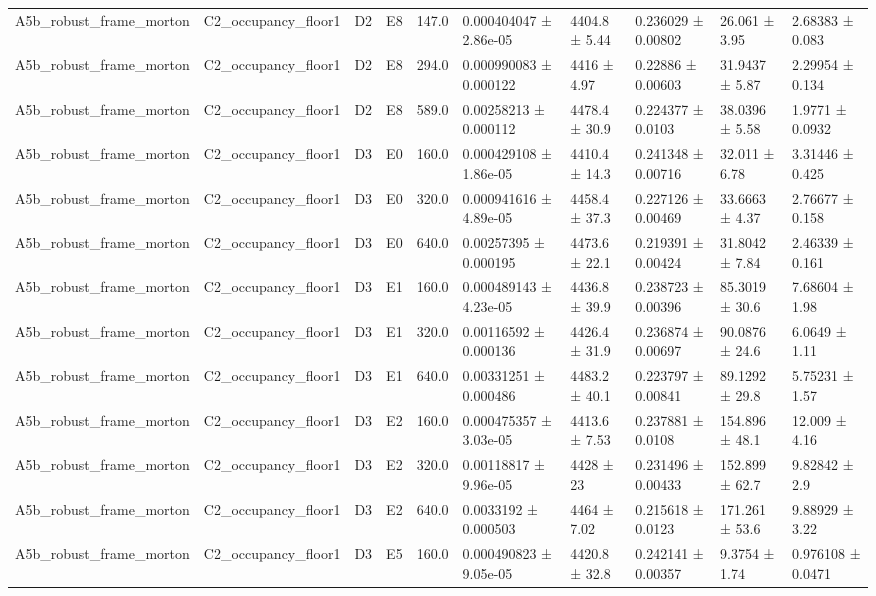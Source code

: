 \begin{table}
\begin{tabular}{llllllllll}
A5b\_robust\_frame\_morton & C2\_occupancy\_floor1 & D2 & E8 & 147.0 & 0.000404047 ± 2.86e-05 & 4404.8 ± 5.44 & 0.236029 ± 0.00802 & 26.061 ± 3.95 & 2.68383 ± 0.083 \\
A5b\_robust\_frame\_morton & C2\_occupancy\_floor1 & D2 & E8 & 294.0 & 0.000990083 ± 0.000122 & 4416 ± 4.97 & 0.22886 ± 0.00603 & 31.9437 ± 5.87 & 2.29954 ± 0.134 \\
A5b\_robust\_frame\_morton & C2\_occupancy\_floor1 & D2 & E8 & 589.0 & 0.00258213 ± 0.000112 & 4478.4 ± 30.9 & 0.224377 ± 0.0103 & 38.0396 ± 5.58 & 1.9771 ± 0.0932 \\
A5b\_robust\_frame\_morton & C2\_occupancy\_floor1 & D3 & E0 & 160.0 & 0.000429108 ± 1.86e-05 & 4410.4 ± 14.3 & 0.241348 ± 0.00716 & 32.011 ± 6.78 & 3.31446 ± 0.425 \\
A5b\_robust\_frame\_morton & C2\_occupancy\_floor1 & D3 & E0 & 320.0 & 0.000941616 ± 4.89e-05 & 4458.4 ± 37.3 & 0.227126 ± 0.00469 & 33.6663 ± 4.37 & 2.76677 ± 0.158 \\
A5b\_robust\_frame\_morton & C2\_occupancy\_floor1 & D3 & E0 & 640.0 & 0.00257395 ± 0.000195 & 4473.6 ± 22.1 & 0.219391 ± 0.00424 & 31.8042 ± 7.84 & 2.46339 ± 0.161 \\
A5b\_robust\_frame\_morton & C2\_occupancy\_floor1 & D3 & E1 & 160.0 & 0.000489143 ± 4.23e-05 & 4436.8 ± 39.9 & 0.238723 ± 0.00396 & 85.3019 ± 30.6 & 7.68604 ± 1.98 \\
A5b\_robust\_frame\_morton & C2\_occupancy\_floor1 & D3 & E1 & 320.0 & 0.00116592 ± 0.000136 & 4426.4 ± 31.9 & 0.236874 ± 0.00697 & 90.0876 ± 24.6 & 6.0649 ± 1.11 \\
A5b\_robust\_frame\_morton & C2\_occupancy\_floor1 & D3 & E1 & 640.0 & 0.00331251 ± 0.000486 & 4483.2 ± 40.1 & 0.223797 ± 0.00841 & 89.1292 ± 29.8 & 5.75231 ± 1.57 \\
A5b\_robust\_frame\_morton & C2\_occupancy\_floor1 & D3 & E2 & 160.0 & 0.000475357 ± 3.03e-05 & 4413.6 ± 7.53 & 0.237881 ± 0.0108 & 154.896 ± 48.1 & 12.009 ± 4.16 \\
A5b\_robust\_frame\_morton & C2\_occupancy\_floor1 & D3 & E2 & 320.0 & 0.00118817 ± 9.96e-05 & 4428 ± 23 & 0.231496 ± 0.00433 & 152.899 ± 62.7 & 9.82842 ± 2.9 \\
A5b\_robust\_frame\_morton & C2\_occupancy\_floor1 & D3 & E2 & 640.0 & 0.0033192 ± 0.000503 & 4464 ± 7.02 & 0.215618 ± 0.0123 & 171.261 ± 53.6 & 9.88929 ± 3.22 \\
A5b\_robust\_frame\_morton & C2\_occupancy\_floor1 & D3 & E5 & 160.0 & 0.000490823 ± 9.05e-05 & 4420.8 ± 32.8 & 0.242141 ± 0.00357 & 9.3754 ± 1.74 & 0.976108 ± 0.0471 \\

\end{tabular}
\end{table}
